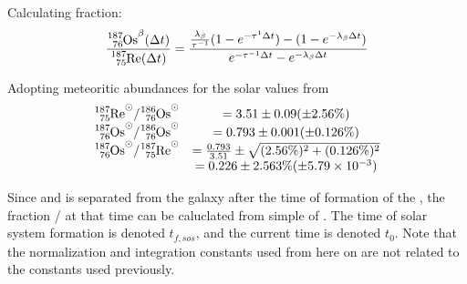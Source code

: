 Calculating fraction:
\begin{equation}
  \label{eq:luck-fraction}
  \frac{\os{187}^\beta(\Delta t)}{\re{187}(\Delta t)} = \frac{\frac{\lambda_\beta}{\tau^{-1}} (1-e^{-\tau^{1}\Delta t}) - (1-e^{-\lambda_\beta \Delta t})}{e^{-\tau^{-1} \Delta t} - e^{-\lambda_\beta \Delta t}}
\end{equation}

Adopting meteoritic abundances for the solar values  from 
\begin{equation}
  \label{eq:shizuma-frac}
  \begin{array}{cc}
    \re{187}^\odot/\os{186}^\odot &= 3.51 \pm 0.09 (\pm 2.56\%) \\
    \os{187}^\odot/\os{186}^\odot &= 0.793 \pm 0.001 (\pm 0.126\%) \\
    \os{187}^\odot/\re{187}^\odot &= \frac{0.793}{3.51} \pm \sqrt{(2.56\%)^2 + (0.126\%)^2} \\
    &= 0.226 \pm 2.563\% (\pm 5.79\times 10^{-3})
  \end{array}
\end{equation}

Since  and  is separated from the galaxy after the time of formation of the \sos,
the fraction / at that time can be caluclated from simple \betadecay of .
The time of solar system formation is denoted $t_{f,sos}$, and the current time is denoted $t_0$.
Note that the normalization and integration constants used from here on are not related to the constants used previously.

